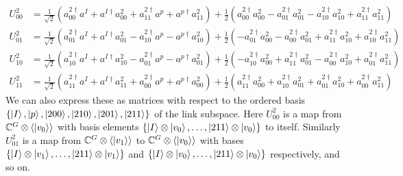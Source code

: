 \documentclass[11pt,reqno]{amsart}
\numberwithin{equation}{section}
\begin{document}
	\begin{align}
		U^2_{00} &= \frac{1}{\sqrt{2}} (a^{2\dagger}_{00}a^I+a^{I\dagger}a^2_{00}+a^{2\dagger}_{11}a^p+a^{p\dagger}a^2_{11} ) +\frac{1}{2} (a^{2\dagger}_{00}a^2_{00}-a^{2\dagger}_{01}a^2_{01}-a^{2\dagger}_{10}a^2_{10}+a^{2\dagger}_{11}a^2_{11}) \nonumber\\
		U^2_{01} &= \frac{1}{\sqrt{2}} (a^{2\dagger}_{01}a^I+a^{I\dagger}a^2_{01}-a^{2\dagger}_{10}a^p-a^{p\dagger}a^2_{10} ) +\frac{1}{2} (-a^{2\dagger}_{01}a^2_{00}-a^{2\dagger}_{00}a^2_{01}+a^{2\dagger}_{11}a^2_{10}+a^{2\dagger}_{10}a^2_{11}) \nonumber\\
		U^2_{10} &= \frac{1}{\sqrt{2}} (a^{2\dagger}_{10}a^I+a^{I\dagger}a^2_{10}-a^{2\dagger}_{01}a^p-a^{p\dagger}a^2_{01} ) +\frac{1}{2} (-a^{2\dagger}_{10}a^2_{00}+a^{2\dagger}_{11}a^2_{01}-a^{2\dagger}_{00}a^2_{10}+a^{2\dagger}_{01}a^2_{11}) \nonumber\\
		U^2_{11} &= \frac{1}{\sqrt{2}} (a^{2\dagger}_{11}a^I+a^{I\dagger}a^2_{11}+a^{2\dagger}_{00}a^p+a^{p\dagger}a^2_{00} ) +\frac{1}{2} (a^{2\dagger}_{11}a^2_{00}+a^{2\dagger}_{10}a^2_{01}+a^{2\dagger}_{01}a^2_{10}+a^{2\dagger}_{00}a^2_{11}) 
	\end{align}
	We can also express these as matrices with respect to the ordered basis $\{ \ket{I},\ket{p},\ket{200},\ket{210},\ket{201},\ket{211} \}$ of the link subspace.
	Here $U^2_{00}$ is a map from $\mathbb{C}^G \otimes \langle \ket{v_0} \rangle$ with basis elements $\{\ket{I}\otimes \ket{v_0},\ldots,\ket{211}\otimes \ket{v_0} \}$ to itself.
	Similarly $U^2_{01}$ is a map from $\mathbb{C}^G \otimes \langle \ket{v_1} \rangle$ to $\mathbb{C}^G \otimes \langle \ket{v_0} \rangle$ with bases $\{\ket{I}\otimes \ket{v_1},\ldots,\ket{211}\otimes \ket{v_1} \}$ and $\{\ket{I}\otimes \ket{v_0},\ldots,\ket{211}\otimes \ket{v_0} \}$ respectively, and so on.
\end{document}
